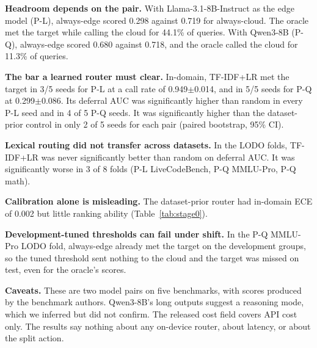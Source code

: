 \documentclass[lettersize,journal]{IEEEtran}
\begin{document}
\begin{table}[t]
\centering
\caption{Stage 0, in-domain test (mean$\pm$std over 5 seeds; $n\approx486$ per
seed). ``Target met'': seeds where test quality reached strong $-1$ point at the
threshold tuned on the development split. $^\dagger$Routes on dataset identity
(a leakage control). $^\ddagger$Upper bound. Measured on released
LLMRouterBench scores; no model inference.}
\label{tab:stage0}
\scriptsize
\setlength{\tabcolsep}{3pt}

\end{table}

\begin{table}[t]
\centering
\caption{Stage 0, deferral AUC on the held-out dataset group (LODO, seed 0).}
\label{tab:stage0lodo}
\scriptsize

\end{table}

\textbf{Headroom depends on the pair.} With Llama-3.1-8B-Instruct as the edge
model (P-L), always-edge scored 0.298 against 0.719 for always-cloud. The oracle
met the target while calling the cloud for 44.1\% of queries. With Qwen3-8B
(P-Q), always-edge scored 0.680 against 0.718, and the oracle called the cloud
for 11.3\% of queries.

\textbf{The bar a learned router must clear.} In-domain, TF-IDF+LR met the
target in 3/5 seeds for P-L at a call rate of 0.949$\pm$0.014, and in 5/5 seeds
for P-Q at 0.299$\pm$0.086. Its deferral AUC was significantly higher than
random in every P-L seed and in 4 of 5 P-Q seeds. It was significantly higher
than the dataset-prior control in only 2 of 5 seeds for each pair (paired
bootstrap, 95\% CI).

\textbf{Lexical routing did not transfer across datasets.} In the LODO folds,
TF-IDF+LR was never significantly better than random on deferral AUC. It was
significantly worse in 3 of 8 folds (P-L LiveCodeBench, P-Q MMLU-Pro, P-Q math).

\textbf{Calibration alone is misleading.} The dataset-prior router had in-domain
ECE of 0.002 but little ranking ability (Table~\ref{tab:stage0}).

\textbf{Development-tuned thresholds can fail under shift.} In the P-Q MMLU-Pro
LODO fold, always-edge already met the target on the development groups, so the
tuned threshold sent nothing to the cloud and the target was missed on test,
even for the oracle's scores.

\textbf{Caveats.} These are two model pairs on five benchmarks, with scores
produced by the benchmark authors. Qwen3-8B's long outputs suggest a reasoning
mode, which we inferred but did not confirm. The released cost field covers API
cost only. The results say nothing about any on-device router, about latency, or
about the split action.
\end{document}
